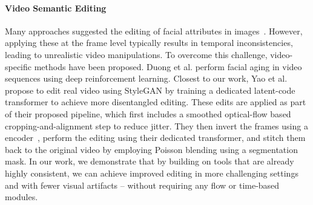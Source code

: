 \paragraph{Video Semantic Editing}

Many approaches suggested the editing of facial attributes in images~\cite{lample2017fader, choi2018stargan, liu2019stgan, mokady2019masked, he2019attgan}. However, applying these at the frame level typically results in temporal inconsistencies, leading to unrealistic video manipulations.
To overcome this challenge, video-specific methods have been proposed. 
Duong et al. perform facial aging in video sequences using deep reinforcement learning. Closest to our work, Yao et al.~ propose to edit real video using StyleGAN by training a dedicated latent-code transformer to achieve more disentangled editing. These edits are applied as part of their proposed pipeline, which first includes a smoothed optical-flow based cropping-and-alignment step to reduce jitter. They then invert the frames using a \wplus encoder~\cite{richardson2020encoding}, perform the editing using their dedicated transformer, and stitch them back to the original video by employing Poisson blending using a segmentation mask.
In our work, we demonstrate that by building on tools that are already highly consistent, we can achieve improved editing in more challenging settings and with fewer visual artifacts -- without requiring any flow or time-based modules.


